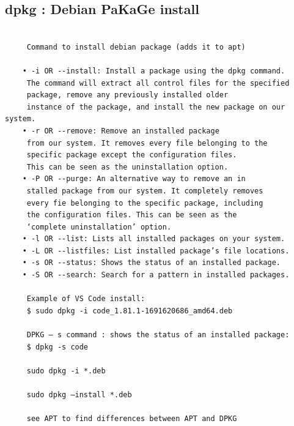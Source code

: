 \documentclass[a4paper,12pt]{article}
\begin{document}
\subsection{dpkg   : Debian PaKaGe install}
\begin{verbatim}

     Command to install debian package (adds it to apt)

    • -i OR --install: Install a package using the dpkg command.
     The command will extract all control files for the specified
     package, remove any previously installed older 
     instance of the package, and install the new package on our system.
    • -r OR --remove: Remove an installed package 
     from our system. It removes every file belonging to the 
     specific package except the configuration files. 
     This can be seen as the uninstallation option.
    • -P OR --purge: An alternative way to remove an in
     stalled package from our system. It completely removes
     every fie belonging to the specific package, including
     the configuration files. This can be seen as the 
     ‘complete uninstallation’ option.
    • -l OR --list: Lists all installed packages on your system.
    • -L OR --listfiles: List installed package’s file locations.
    • -s OR --status: Shows the status of an installed package.
    • -S OR --search: Search for a pattern in installed packages.

     Example of VS Code install: 
     $ sudo dpkg -i code_1.81.1-1691620686_amd64.deb
     
     DPKG – s command : shows the status of an installed package: 
﻿     $ dpkg -s code     
     
     sudo dpkg -i *.deb

     sudo dpkg –install *.deb 

     see APT to find differences between APT and DPKG

\end{verbatim}
\end{document}
